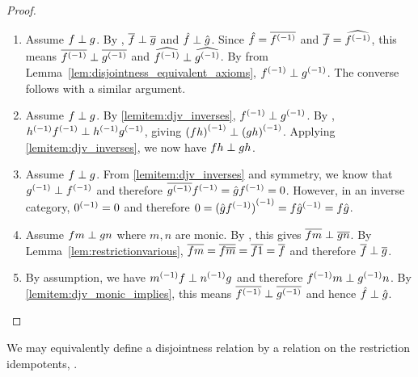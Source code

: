 \begin{proof}
  \prepprooflist
  \begin{enumerate}[{(}i{)}]
    \item Assume $f \perp g$. By , $\overline{f} \perp \overline{g}$ and
      $\hat{f}\perp\hat{g}$. Since $\hat{f} = \overline{{f}^{(-1)}}$ and $\overline{f} = \widehat{{f}^{(-1)}}$, this
      means $\overline{{f}^{(-1)}} \perp \overline{{g}^{(-1)}}$ and $\widehat{{f}^{(-1)}}\perp\widehat{{g}^{(-1)}}$. By
       from Lemma~\ref{lem:disjointness_equivalent_axioms},
      ${f}^{(-1)} \perp {g}^{(-1)}$. The converse follows with  a similar argument.
    \item Assume $f \perp g$. By \ref{lemitem:djv_inverses}, ${f}^{(-1)}\perp{g}^{(-1)}$. By
      , ${h}^{(-1)}{f}^{(-1)}\perp{h}^{(-1)}{g}^{(-1)}$, giving ${(f h)}^{(-1)} \perp
      {(g h)}^{(-1)}$. Applying \ref{lemitem:djv_inverses}, we now have $f h \perp g h$.
    \item Assume $f \perp g$. From \ref{lemitem:djv_inverses} and symmetry, we know that
      ${g}^{(-1)} \perp {f}^{(-1)}$ and therefore $\overline{{g}^{(-1)}}{f}^{(-1)} = \hat{g}{f}^{(-1)}= 0$. However, in
      an inverse category, ${0}^{(-1)} = 0$ and therefore $0 = {(\hat{g}{f}^{(-1)})}^{(-1)} = f {\hat{g}}^{(-1)} =
      f \hat{g}$.
    \item Assume $f m \perp g n$ where $m, n$ are monic. By , this gives
      $\overline{f m} \perp \overline{g n}$. By Lemma~\ref{lem:restrictionvarious},
      $\overline{f m} = \overline{f \overline{m}} = \overline{f 1} = \overline{f}$ and therefore $\overline{f} \perp \overline{g}$.
    \item By assumption, we have ${m}^{(-1)} f \perp  {n}^{(-1)}g$ and therefore ${f}^{(-1)}m \perp
      {g}^{(-1)} n$. By \ref{lemitem:djv_monic_implies}, this means $\overline{{f}^{(-1)}} \perp
      \overline{{g}^{(-1)}}$ and hence $\hat{f} \perp \hat{g}$.
  \end{enumerate}
\end{proof}

We may equivalently define a disjointness relation by a relation on the restriction idempotents, .

